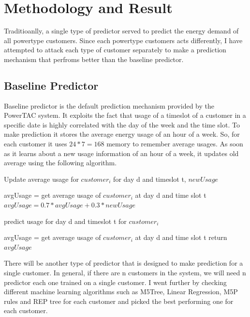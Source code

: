 
\chapter{Methodology and Result}

Traditioanlly, a single type of predictor served to predict the energy demand of all powertype customers. Since each powertype customers acts differently, I have attempted to attack each type of customer separately to make a prediction mechanism that perfroms better than the baseline predictor.

\section{Baseline Predictor}
Baseline predictor is the default prediction mechanism provided by the PowerTAC system. It exploits the fact that usage of a timeslot of a customer in a specific date is highly correlated with the day of the week and the time slot. To make prediction it stores the average energy usage of an hour of a week. So, for each customer it uses $24*7 = 168$ memory to remember average usages. As soon as it learns about a new usage information of an hour of a week, it updates old average using the following algorithm.


\begin{algorithm}
 
\caption{Update average usage for $customer_i$ for day d and timeslot t, $newUsage$}
\begin{algorithmic} [1]
\STATE avgUsage = get average usage of $customer_i$ at day d and time slot t
\STATE $avgUsage = 0.7 * avgUsage + 0.3 * newUsage$
\end{algorithmic}
\label{alg:updateAvgMovingAvg}
\end{algorithm}

\begin{algorithm}
\caption{predict usage for day d and timeslot t for $customer_i$}
\begin{algorithmic} [1]
\STATE avgUsage = get average usage of $customer_i$ at day d and time slot t 
\STATE return $avgUsage$
\end{algorithmic}
 \label{alg:predictAvgMovingAvg}
\end{algorithm}

There will be another type of predictor that is designed to make prediction for a single customer. In general, if there are n customers in the system, we will need n predictor each one trained on a single customer. I went further by checking different machine learning algorithms such as M5Tree, Linear Regression, M5P rules and REP tree for each customer and picked the best performing one for each customer.

